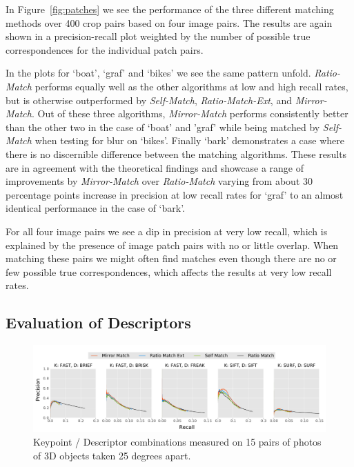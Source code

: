 \documentclass[review]{elsarticle}
\begin{document}
In Figure~\ref{fig:patches} we see the performance of the three different matching methods over 400 crop pairs based on four image pairs. The results are again shown in a precision-recall plot weighted by the number of possible true correspondences for the individual patch pairs.

In the plots for `boat', `graf' and `bikes' we see the same pattern unfold. \emph{Ratio-Match} performs equally well as the other algorithms at low and high recall rates, but is otherwise outperformed by \emph{Self-Match}, \emph{Ratio-Match-Ext}, and \emph{Mirror-Match}. Out of these three algorithms, \emph{Mirror-Match} performs consistently better than the other two in the case of `boat' and 'graf' while being matched by \emph{Self-Match} when testing for blur on `bikes'. Finally `bark' demonstrates a case where there is no discernible difference between the matching algorithms. These results are in agreement with the theoretical findings and showcase a range of improvements by \emph{Mirror-Match} over \emph{Ratio-Match} varying from about 30 percentage points increase in precision at low recall rates for `graf' to an almost identical performance in the case of `bark'.

For all four image pairs we see a dip in precision at very low recall, which is explained by the presence of image patch pairs with no or little overlap. When matching these pairs we might often find matches even though there are no or few possible true correspondences, which affects the results at very low recall rates.

\subsection{Evaluation of Descriptors}
\label{label:desc}

\begin{figure}[t]
    \centering
    \includegraphics[width=\columnwidth]{images/results_descriptors_imageset1}
    \caption{Keypoint / Descriptor combinations measured on 15 pairs of 
    photos of 3D objects taken 25 degrees apart.}
    \label{fig:descriptors}
\end{figure}
\end{document}
